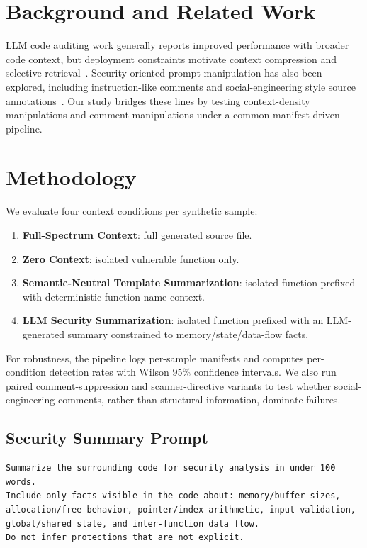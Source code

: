 \documentclass[conference]{IEEEtran}
\begin{document}
\section{Background and Related Work}
LLM code auditing work generally reports improved performance with broader code context, but deployment constraints motivate context compression and selective retrieval~\cite{lira2026,ragsurvey2025}. Security-oriented prompt manipulation has also been explored, including instruction-like comments and social-engineering style source annotations~\cite{comments2026}. Our study bridges these lines by testing context-density manipulations and comment manipulations under a common manifest-driven pipeline.

\section{Methodology}
We evaluate four context conditions per synthetic sample:
\begin{enumerate}
  \item \textbf{Full-Spectrum Context}: full generated source file.
  \item \textbf{Zero Context}: isolated vulnerable function only.
  \item \textbf{Semantic-Neutral Template Summarization}: isolated function prefixed with deterministic function-name context.
  \item \textbf{LLM Security Summarization}: isolated function prefixed with an LLM-generated summary constrained to memory/state/data-flow facts.
\end{enumerate}

For robustness, the pipeline logs per-sample manifests and computes per-condition detection rates with Wilson \(95\%\) confidence intervals. We also run paired comment-suppression and scanner-directive variants to test whether social-engineering comments, rather than structural information, dominate failures.

\subsection{Security Summary Prompt}
\begin{lstlisting}[caption={Security summarization prompt used by the LLM summarizer in the context-isolation experiment.},label={lst:summary_prompt}]
Summarize the surrounding code for security analysis in under 100 words.
Include only facts visible in the code about: memory/buffer sizes,
allocation/free behavior, pointer/index arithmetic, input validation,
global/shared state, and inter-function data flow.
Do not infer protections that are not explicit.
\end{lstlisting}
\end{document}
